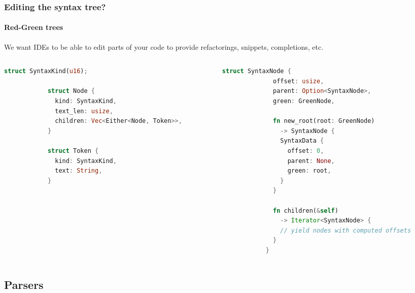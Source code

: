 \documentclass[compress,12pt,xcolor={dvipsnames}]{beamer}
\begin{document}
\begin{frame}[fragile]
	\frametitle{Editing the syntax tree?}
	\framesubtitle{Red-Green trees}

	We want IDEs to be able to edit parts of your code to provide refactorings, snippets, completions, etc.
	\begin{columns}
		\begin{column}{0.47\textwidth}
			\center{\textcolor{green}{Green tree}}

			\begin{lstlisting}[language=Rust, gobble=12, basicstyle=\tt\tiny]
            struct SyntaxKind(u16);

            struct Node {
              kind: SyntaxKind,
              text_len: usize,
              children: Vec<Either<Node, Token>>,
            }

            struct Token {
              kind: SyntaxKind,
              text: String,
            }
            \end{lstlisting}
		\end{column}
		\begin{column}{0.53\textwidth}
			\center{\textcolor{red}{Red tree}}

			\begin{lstlisting}[language=Rust, gobble=12, basicstyle=\tt\tiny]
            struct SyntaxNode {
              offset: usize,
              parent: Option<SyntaxNode>,
              green: GreenNode,

              fn new_root(root: GreenNode)
                -> SyntaxNode {
                SyntaxData {
                  offset: 0,
                  parent: None,
                  green: root,
                }
              }

              fn children(&self)
                -> Iterator<SyntaxNode> {
                // yield nodes with computed offsets
              }
            }
            \end{lstlisting}
		\end{column}
	\end{columns}


\end{frame}

\subsection{Parsers}
\end{document}
